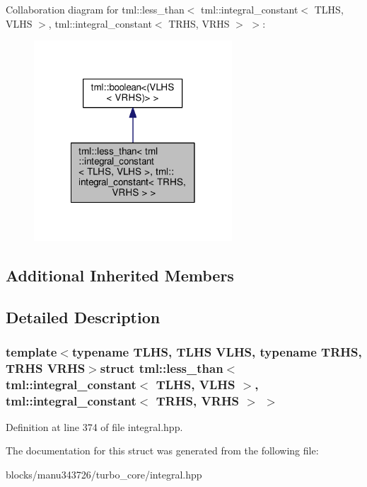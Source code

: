 Collaboration diagram for tml\+:\+:less\+\_\+than$<$ tml\+:\+:integral\+\_\+constant$<$ T\+L\+H\+S, V\+L\+H\+S $>$, tml\+:\+:integral\+\_\+constant$<$ T\+R\+H\+S, V\+R\+H\+S $>$ $>$\+:
\nopagebreak
\begin{figure}[H]
\begin{center}
\leavevmode
\includegraphics[width=210pt]{structtml_1_1less__than_3_01tml_1_1integral__constant_3_01_t_l_h_s_00_01_v_l_h_s_01_4_00_01tml_132b69ce82f275e664242e9040e775c85}
\end{center}
\end{figure}
\subsection*{Additional Inherited Members}


\subsection{Detailed Description}
\subsubsection*{template$<$typename T\+L\+H\+S, T\+L\+H\+S V\+L\+H\+S, typename T\+R\+H\+S, T\+R\+H\+S V\+R\+H\+S$>$struct tml\+::less\+\_\+than$<$ tml\+::integral\+\_\+constant$<$ T\+L\+H\+S, V\+L\+H\+S $>$, tml\+::integral\+\_\+constant$<$ T\+R\+H\+S, V\+R\+H\+S $>$ $>$}



Definition at line 374 of file integral.\+hpp.



The documentation for this struct was generated from the following file\+:\begin{DoxyCompactItemize}
\item 
blocks/manu343726/turbo\+\_\+core/integral.\+hpp\end{DoxyCompactItemize}
